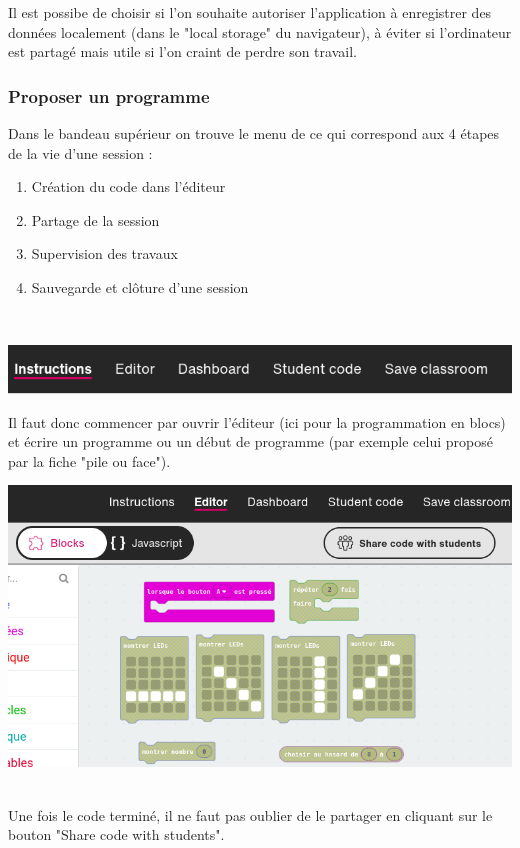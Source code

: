 \begin{remarque}
    Il est possibe de choisir si l'on souhaite autoriser l'application à enregistrer des données
     localement (dans le "local storage" du navigateur), à éviter si l'ordinateur est partagé 
     mais utile si l'on craint de perdre son travail.
\end{remarque}
\vspace{5mm}

\subsubsection{Proposer un programme}


\begin{methode}
    Dans le bandeau supérieur on trouve le menu de ce qui correspond aux 4 étapes
     de la vie d'une session :
     \begin{enumerate}
        \item Création du code dans l'éditeur
        \item Partage de la session
        \item Supervision des travaux
        \item Sauvegarde et clôture d'une session         
     \end{enumerate}~\\

    \centerline{\includegraphics[width=0.8\linewidth]{res/classroom_menu.png}}
    
    Il faut donc commencer par ouvrir l'éditeur (ici pour la programmation en blocs) et écrire
    un programme ou un début de programme (par exemple celui proposé par la fiche "pile ou face").
    \vspace{5mm}

    \centerline{\includegraphics[width=0.6\linewidth]{res/classroom_editor.png}}~\\

    Une fois le code terminé, il ne faut pas oublier de le partager en cliquant sur le bouton
     "Share code with students".

\end{methode}



